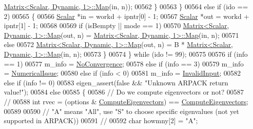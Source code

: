 \begin{DoxyCode}
      \hyperlink{group___core___module_class_eigen_1_1_matrix}{Matrix<Scalar, Dynamic, 1>::Map}(in, n));
00562       \}
00563     \}
00564     \textcolor{keywordflow}{else} \textcolor{keywordflow}{if} (ido == 2)
00565     \{
00566       \hyperlink{class_eigen_1_1_arpack_generalized_self_adjoint_eigen_solver_ab1182405bfe87a505d4b7a8311c661ec}{Scalar} *in  = workd + ipntr[0] - 1;
00567       \hyperlink{class_eigen_1_1_arpack_generalized_self_adjoint_eigen_solver_ab1182405bfe87a505d4b7a8311c661ec}{Scalar} *out = workd + ipntr[1] - 1;
00568 
00569       \textcolor{keywordflow}{if} (isBempty || mode == 1)
00570         \hyperlink{group___core___module_class_eigen_1_1_matrix}{Matrix<Scalar, Dynamic, 1>::Map}(out, n) = 
      \hyperlink{group___core___module_class_eigen_1_1_matrix}{Matrix<Scalar, Dynamic, 1>::Map}(in, n);
00571       \textcolor{keywordflow}{else}
00572         \hyperlink{group___core___module_class_eigen_1_1_matrix}{Matrix<Scalar, Dynamic, 1>::Map}(out, n) = B * 
      \hyperlink{group___core___module_class_eigen_1_1_matrix}{Matrix<Scalar, Dynamic, 1>::Map}(in, n);
00573     \}
00574   \} \textcolor{keywordflow}{while} (ido != 99);
00575 
00576   \textcolor{keywordflow}{if} (info == 1)
00577     m\_info = \hyperlink{group__enums_gga85fad7b87587764e5cf6b513a9e0ee5eaba1c8763d1179778070f365ecc4157a8}{NoConvergence};
00578   \textcolor{keywordflow}{else} \textcolor{keywordflow}{if} (info == 3)
00579     m\_info = \hyperlink{group__enums_gga85fad7b87587764e5cf6b513a9e0ee5eaaf9b736d310a664e7729d163a035cc5f}{NumericalIssue};
00580   \textcolor{keywordflow}{else} \textcolor{keywordflow}{if} (info < 0)
00581     m\_info = \hyperlink{group__enums_gga85fad7b87587764e5cf6b513a9e0ee5ea945604f62795ffc70aedf2bd12ea0434}{InvalidInput};
00582   \textcolor{keywordflow}{else} \textcolor{keywordflow}{if} (info != 0)
00583     eigen\_assert(\textcolor{keyword}{false} && \textcolor{stringliteral}{"Unknown ARPACK return value!"});
00584   \textcolor{keywordflow}{else}
00585   \{
00586     \textcolor{comment}{// Do we compute eigenvectors or not?}
00587     \textcolor{comment}{//}
00588     \textcolor{keywordtype}{int} rvec = (options & \hyperlink{group__enums_ggae3e239fb70022eb8747994cf5d68b4a9ada93d8885bde32b876ba4af01d3292cc}{ComputeEigenvectors}) == 
      \hyperlink{group__enums_ggae3e239fb70022eb8747994cf5d68b4a9ada93d8885bde32b876ba4af01d3292cc}{ComputeEigenvectors};
00589 
00590     \textcolor{comment}{// "A" means "All", use "S" to choose specific eigenvalues (not yet supported in ARPACK))}
00591     \textcolor{comment}{//}
00592     \textcolor{keywordtype}{char} howmny[2] = \textcolor{stringliteral}{"A"}; 

\end{DoxyCode}
